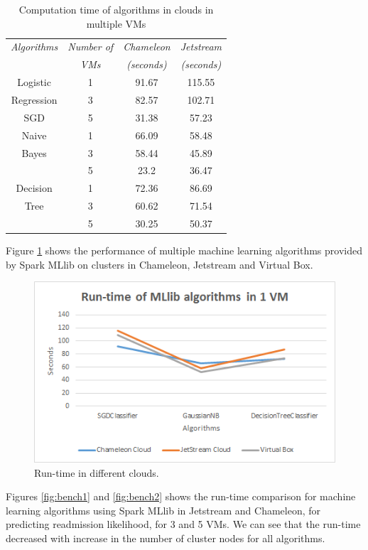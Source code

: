 \documentclass[9pt,twocolumn,twoside]{../../styles/osajnl}
\begin{document}
\begin{table}[h!]
\centering
\caption{Computation time of algorithms in clouds in multiple VMs}
 \begin{tabular}{|c|c|c c|} 
 \hline
\textit{Algorithms} & \textit{Number of}  & \textit{Chameleon} & \textit{Jetstream}\\
& \textit{VMs} & \textit{(seconds)} & \textit{(seconds)}\\
 \hline
 \hline 
Logistic   & 1 & 91.67 & 115.55\\
Regression & 3 & 82.57 & 102.71\\
SGD & 5 & 31.38 & 57.23\\
\hline 
Naive  & 1 & 66.09 & 58.48\\
Bayes & 3 & 58.44 & 45.89\\
& 5 & 23.2 & 36.47\\
\hline
Decision & 1 & 72.36 & 86.69\\
Tree & 3 & 60.62 & 71.54\\
& 5 & 30.25 & 50.37\\
\hline
\end{tabular}
\label{table:bench}
\end{table}

Figure \ref{fig:bench} shows the performance of multiple machine learning algorithms provided by Spark MLlib on clusters in Chameleon, Jetstream and Virtual Box.
\begin{figure}[h!]
	\centering
	\includegraphics[width=\linewidth]{images/Benchmarking.png}
	\caption{Run-time in different clouds.}
	\label{fig:bench}
\end{figure}

Figures \ref{fig:bench1} and \ref{fig:bench2} shows the run-time comparison for machine learning algorithms using Spark MLlib in Jetstream and Chameleon, for predicting readmission likelihood, for 3 and 5 VMs. We can see that the run-time decreased with increase in the number of cluster nodes for all algorithms.
\end{document}
